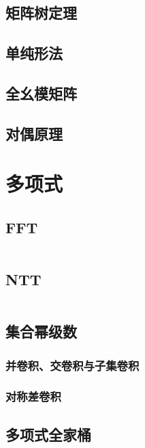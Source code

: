 \documentclass[10pt, a4paper, oneside]{ctexart}
\begin{document}
\begin{multicols}{2}
        \subsection{矩阵树定理}
        
        \subsection{单纯形法}
        
        \subsection{全幺模矩阵}
        
        \subsection{对偶原理}
        
        \newpage

        \section{多项式}
        \subsection{FFT}
        \inputminted{cpp}{src/poly/fft.cpp}
        \subsection{NTT}
        \inputminted{cpp}{src/poly/ntt.cpp}
        \subsection{集合幂级数}
        \subsubsection{并卷积、交卷积与子集卷积}
        
        \subsubsection{对称差卷积}
        
        \subsection{多项式全家桶}
        \inputminted{cpp}{src/poly/poly.cpp}
        \newpage


\end{multicols}
\end{document}
